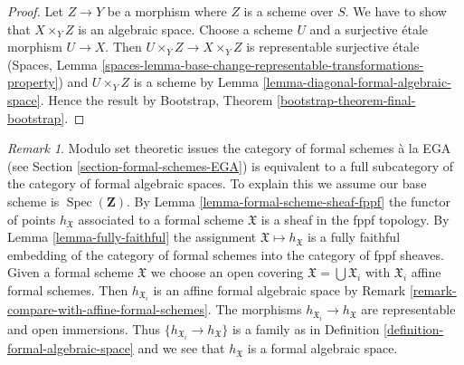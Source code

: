 \documentclass{stacks-project}
\theoremstyle{plain}
\theoremstyle{definition}
\theoremstyle{remark}
\newtheorem{remark}[subsection]{Remark}
\numberwithin{equation}{subsection}
\def\Spec{\mathop{\mathrm{Spec}}}
\begin{document}
\begin{proof}
Let $Z \to Y$ be a morphism where $Z$ is a scheme over $S$.
We have to show that $X \times_Y Z$ is an algebraic space.
Choose a scheme $U$ and a surjective \'etale morphism $U \to X$.
Then $U \times_Y Z \to X \times_Y Z$ is representable surjective \'etale
(Spaces, Lemma
\ref{spaces-lemma-base-change-representable-transformations-property})
and $U \times_Y Z$ is a scheme by
Lemma \ref{lemma-diagonal-formal-algebraic-space}.
Hence the result by
Bootstrap, Theorem \ref{bootstrap-theorem-final-bootstrap}.
\end{proof}

\begin{remark}
\label{remark-compare-with-formal-schemes}
Modulo set theoretic issues the category of formal schemes \`a la EGA
(see Section \ref{section-formal-schemes-EGA}) is equivalent to a full
subcategory of the category of formal algebraic spaces. To explain this
we assume our base scheme is $\Spec(\mathbf{Z})$. By
Lemma \ref{lemma-formal-scheme-sheaf-fppf} the functor of points
$h_\mathfrak X$ associated to a formal scheme $\mathfrak X$ is a sheaf
in the fppf topology. By Lemma \ref{lemma-fully-faithful}
the assignment $\mathfrak X \mapsto h_\mathfrak X$ is a fully faithful
embedding of the category of formal schemes into the category of
fppf sheaves. Given a formal scheme $\mathfrak X$ we choose an open covering
$\mathfrak X = \bigcup \mathfrak X_i$ with $\mathfrak X_i$
affine formal schemes. Then $h_{\mathfrak X_i}$
is an affine formal algebraic space by
Remark \ref{remark-compare-with-affine-formal-schemes}.
The morphisms $h_{\mathfrak X_i} \to h_\mathfrak X$ are representable
and open immersions. Thus $\{h_{\mathfrak X_i} \to h_\mathfrak X\}$
is a family as in Definition \ref{definition-formal-algebraic-space}
and we see that $h_\mathfrak X$ is a formal algebraic space.
\end{remark}
\end{document}
